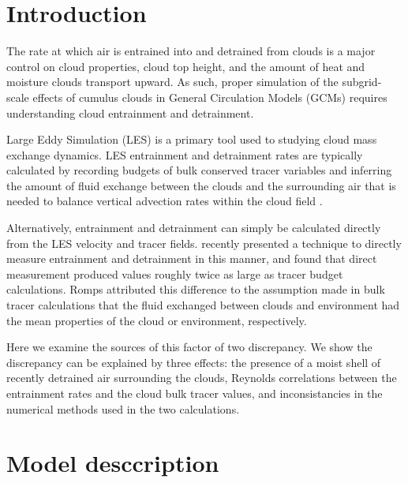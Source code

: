 \documentclass[draft,grl]{agutex}
\begin{document}
\begin{article}

%
%

\section{Introduction}

The rate at which air is entrained into and detrained from clouds is a major 
control on cloud properties, cloud top height, and the amount of heat and 
moisture clouds transport upward.  As such, proper simulation of the 
subgrid-scale effects of cumulus clouds in General Circulation Models (GCMs) 
requires understanding cloud entrainment and detrainment.

Large Eddy Simulation (LES) is a primary tool used to studying cloud mass
exchange dynamics.  LES entrainment and detrainment rates are typically 
calculated by recording budgets of bulk conserved tracer variables and 
inferring the amount of fluid exchange between the clouds and the surrounding 
air that is needed to balance vertical advection rates within the cloud field 
\citep{Siebesma1995}.

Alternatively, entrainment and detrainment can simply be calculated directly 
from the LES velocity and tracer fields.  \cite{Romps2010} recently presented 
a technique to directly measure entrainment and detrainment in this manner, 
and found that direct measurement produced values roughly twice as large as 
tracer budget calculations.  Romps attributed this difference to the assumption 
made in bulk tracer calculations that the fluid exchanged between clouds and 
environment had the mean properties of the cloud or environment, respectively.

Here we examine the sources of this factor of two discrepancy.  We show the 
discrepancy can be explained by three effects: the presence of a moist shell 
of recently detrained air surrounding the clouds, Reynolds correlations 
between the entrainment rates and the cloud bulk tracer values, and 
inconsistancies in the numerical methods used in the two calculations.


\section{Model desccription}


\end{article}
\end{document}
